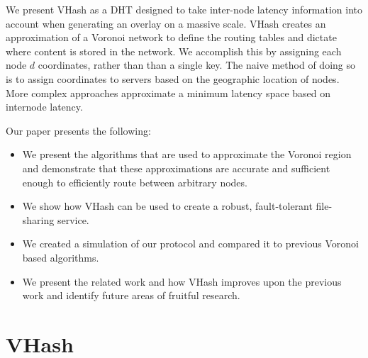 \documentclass{IEEEtran}
\begin{document}
We present VHash as a DHT designed to take inter-node latency information into account when generating an overlay on a massive scale.  VHash creates an approximation of a Voronoi network to define the routing tables and dictate where content is stored in the network.  We accomplish this by assigning each node $d$ coordinates, rather than than a single key.  The naive method of doing so is to assign coordinates to servers based on the geographic location of nodes. More complex approaches approximate a minimum latency space based on internode latency.



 

Our paper presents the following:
\begin{itemize}
	\item We present the algorithms that are used to approximate the Voronoi region and demonstrate that these approximations are accurate and sufficient enough to efficiently route between arbitrary nodes.
	\item We show how VHash can be used to create a robust, fault-tolerant file-sharing service.
	\item We created a simulation of our protocol and compared it to previous Voronoi based algorithms.
	\item We present the related work and how VHash improves upon the previous work and identify future areas of fruitful research.
\end{itemize}


\section{VHash}
\end{document}
